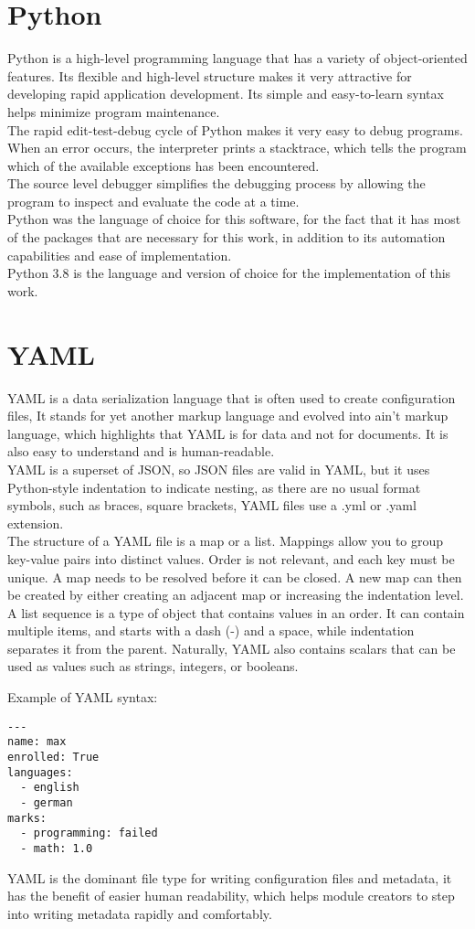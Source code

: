 \section{Python}
Python is a high-level programming language that has a variety of object-oriented features. Its flexible and high-level structure makes it very attractive for developing rapid application development. Its simple and easy-to-learn syntax helps minimize program maintenance.\\
The rapid edit-test-debug cycle of Python makes it very easy to debug programs. When an error occurs, the interpreter prints a stacktrace, which tells the program which of the available exceptions has been encountered.\\
The source level debugger simplifies the debugging process by allowing the program to inspect and evaluate the code at a time\cite{python.org}.\\
Python was the language of choice for this software, for the fact that it has most of the packages that are necessary for this work, in addition to its automation capabilities and ease of implementation.\\
Python 3.8 is the language and version of choice for the implementation of this work.


\section{YAML}
YAML is a data serialization language that is often used to create configuration files,
It stands for yet another markup language and evolved into ain’t markup language,  which highlights that YAML is for data and not for documents. It is also easy to understand and is human-readable.\\
YAML is a superset of JSON, so JSON files are valid in YAML, but it uses Python-style indentation to indicate nesting, as there are no usual format symbols, such as braces, square brackets, YAML files use a .yml or .yaml extension.\\
The structure of a YAML file is a map or a list.
Mappings allow you to group key-value pairs into distinct values. Order is not relevant, and each key must be unique. A map needs to be resolved before it can be closed. A new map can then be created by either creating an adjacent map or increasing the indentation level.\\
A list sequence is a type of object that contains values in an order. It can contain multiple items, and starts with a dash (-) and a space, while indentation separates it from the parent.
Naturally, YAML also contains scalars that can be used as values such as strings, integers, or booleans\cite{yaml_redhat}.

Example of YAML syntax:

\begin{lstlisting}[caption=YAML example, style=pythonstyle]
---
name: max
enrolled: True
languages:
  - english
  - german
marks:
  - programming: failed
  - math: 1.0

\end{lstlisting}
YAML is the dominant file type for writing configuration files and metadata, it has the benefit of easier human readability, which helps module creators to step into writing metadata rapidly and comfortably.
